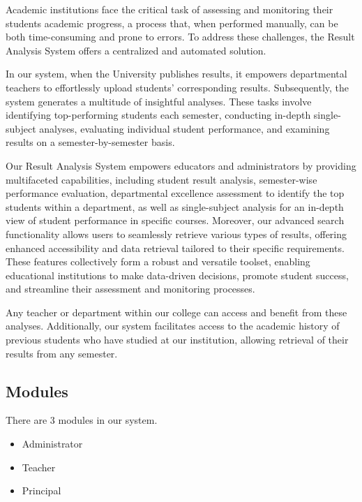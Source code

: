 \documentclass{nascproject}
\begin{document}
Academic institutions face the critical task of assessing and monitoring their students academic progress, a process that, when performed manually, can be both time-consuming and prone to errors. To address these challenges, the Result Analysis System offers a centralized and automated solution.

In our system, when the University publishes results, it empowers departmental teachers to effortlessly upload students' corresponding results. Subsequently, the system generates a multitude of insightful analyses. These tasks involve identifying top-performing students each semester, conducting in-depth single-subject analyses, evaluating individual student performance, and examining results on a semester-by-semester basis.

Our Result Analysis System empowers educators and administrators by providing multifaceted capabilities, including student result analysis, semester-wise performance evaluation, departmental excellence assessment to identify the top students within a department, as well as single-subject analysis for an in-depth view of student performance in specific courses. Moreover, our advanced search functionality allows users to seamlessly retrieve various types of results, offering enhanced accessibility and data retrieval tailored to their specific requirements. These features collectively form a robust and versatile toolset, enabling educational institutions to make data-driven decisions, promote student success, and streamline their assessment and monitoring processes.

Any teacher or department within our college can access and benefit from these analyses. Additionally, our system facilitates access to the academic history of previous students who have studied at our institution, allowing retrieval of their results from any semester.
\subsection{Modules}
	There are 3 modules in our system.
  \begin{itemize}
  	\item Administrator
  	\item Teacher
  	\item Principal
  \end{itemize}
\end{document}
